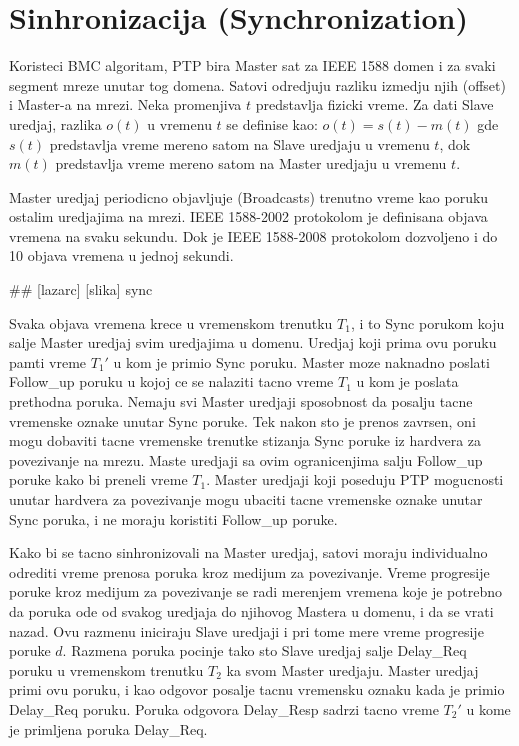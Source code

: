 \documentclass[a4paper,12pt, master]{etf}
\begin{document}
	\section{Sinhronizacija (Synchronization)}

	Koristeci BMC algoritam, PTP bira Master sat za IEEE 1588 domen i za svaki segment mreze unutar
	tog domena.
	Satovi odredjuju razliku izmedju njih (offset) i Master-a na mrezi. Neka promenjiva $t$
	predstavlja fizicki vreme. Za dati Slave uredjaj, razlika $o(t)$ u vremenu $t$ se definise kao:
	$o(t) = s(t) - m(t)$
	gde $s(t)$ predstavlja vreme mereno satom na Slave uredjaju u vremenu $t$, dok $m(t)$
	predstavlja vreme mereno satom na Master uredjaju u vremenu $t$.

	Master uredjaj periodicno objavljuje (Broadcasts) trenutno vreme kao poruku ostalim uredjajima
	na mrezi. IEEE 1588-2002 protokolom je definisana objava vremena na svaku sekundu. Dok je IEEE
	1588-2008 protokolom dozvoljeno i do 10 objava vremena u jednoj sekundi.

	\#\# [lazarc] [slika] sync

	Svaka objava vremena krece u vremenskom trenutku $T_1$, i to Sync porukom koju salje Master
	uredjaj svim uredjajima u domenu. Uredjaj koji prima ovu poruku pamti vreme $T_1'$ u kom je
	primio Sync poruku. Master moze naknadno poslati Follow\_up poruku u kojoj ce se nalaziti tacno
	vreme $T_1$ u kom je poslata prethodna poruka. Nemaju svi Master uredjaji sposobnost da posalju
	tacne vremenske oznake unutar Sync poruke. Tek nakon sto je prenos zavrsen, oni mogu dobaviti
	tacne vremenske trenutke stizanja Sync poruke iz hardvera za povezivanje na mrezu. Maste
	uredjaji sa ovim ogranicenjima salju Follow\_up poruke kako bi preneli vreme $T_1$. Master
	uredjaji koji poseduju PTP mogucnosti unutar hardvera za povezivanje mogu ubaciti tacne
	vremenske oznake unutar Sync poruka, i ne moraju koristiti Follow\_up poruke.

	Kako bi se tacno sinhronizovali na Master uredjaj, satovi moraju individualno odrediti vreme
	prenosa poruka kroz medijum za povezivanje. Vreme progresije poruke kroz medijum za povezivanje
	se radi merenjem vremena koje je potrebno da poruka ode od svakog uredjaja do njihovog Mastera
	u domenu, i da se vrati nazad. Ovu razmenu iniciraju Slave uredjaji i pri tome mere vreme
	progresije poruke $d$. Razmena poruka pocinje tako sto Slave uredjaj salje Delay\_Req poruku u
	vremenskom trenutku $T_2$ ka svom Master uredjaju. Master uredjaj primi ovu poruku, i kao
	odgovor posalje tacnu vremensku oznaku kada je primio Delay\_Req poruku. Poruka odgovora
	Delay\_Resp sadrzi tacno vreme $T_2'$ u kome je primljena poruka Delay\_Req.
\end{document}

